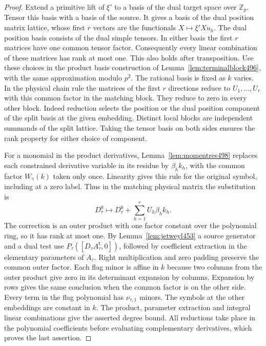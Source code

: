 \documentclass[a4paper,11pt]{article}
\theoremstyle{definition}
\theoremstyle{remark}
\numberwithin{equation}{section}
\begin{document}
\begin{proof}
Extend a primitive lift of \(\xi'\) to a basis of the dual target
space over \(\mathbb Z_p\). Tensor this basis with a basis of the
source. It gives a basis of the dual position matrix lattice,
whose first \(r\) vectors are the functionals \(X\mapsto\xi'Xu_h\).
The dual position basis consists of the dual simple tensors.
In either basis the first \(r\) matrices have one common tensor
factor. Consequently every linear combination of these matrices
has rank at most one. This also holds after transposition. Use
these choices in the product basis construction of
Lemma~\ref{lem:terminalblock496}, with the same approximation
modulo \(p^2\). The rational basis is fixed as \(k\) varies.
In the physical chain rule the matrices of the first \(r\)
directions reduce to \(U_1,\ldots,U_r\) with this common
factor in the matching block. They reduce to zero in every
other block. Indeed reduction selects the position or the dual
position component of the split basis at the given embedding.
Distinct local blocks are independent summands of the split
lattice. Taking the tensor basis on both sides ensures the rank
property for either choice of component.

For a monomial in the product derivatives,
Lemma~\ref{lem:momentres498} replaces each constrained derivative
variable in its residue by \(\beta_h k_h\), with the common factor
\(W_\gamma(k)\) taken only once. Linearity gives this rule for
the original symbol, including at a zero label. Thus in
the matching physical matrix the substitution is
\[
        D_\tau^0\longmapsto D_\tau^0+
                                \sum_{h=1}^r U_h\beta_h k_h .
\]
The correction is an outer product with one factor constant
over the polynomial ring, so it has rank at most one. By
Lemma~\ref{lem:jetweyl453} a source generator and a dual test
use \(P_\tau([D_\tau A_\tau^{\mathsf t},0])\), followed by
coefficient extraction in the elementary parameters of
\(A_\tau\). Right multiplication and zero padding preserve the
common outer factor. Each flag minor is affine in \(k\) because
two columns from the outer product give zero in its determinant
expansion by columns.
Expansion by rows gives the same conclusion when the common
factor is on the other side. Every term in the flag polynomial
has \(\nu_{\tau,1}\) minors. The symbols at the other embeddings
are constant in \(k\). The product, parameter extraction and
integral linear combinations give the asserted degree bound.
All reductions take place in the polynomial coefficients before
evaluating complementary derivatives, which proves the last
assertion.
\end{proof}
\end{document}
